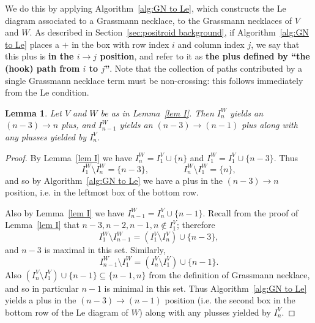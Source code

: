 \documentclass[11pt]{article}
\newtheorem{lem}[thm]{Lemma}
\theoremstyle{remark}
\theoremstyle{definition}
\begin{document}
We do this by applying Algorithm~\ref{alg:GN to Le}, which constructs the Le diagram associated to a Grassmann necklace, to the Grassmann necklaces of $V$ and $W$. As described in Section~\ref{sec:positroid background}, if Algorithm~\ref{alg:GN to Le} places a $+$ in the box with row index $i$ and column index $j$, we say that this plus is {\bf in the $i \rightarrow j$ position}, and refer to it as {\bf the plus defined by ``the (hook) path from $i$ to $j$''}. Note that the collection of paths contributed by a single Grassmann necklace term must be non-crossing: this follows immediately from the Le condition.






\begin{lem}\label{lem n and n-1}
Let $V$ and $W$ be as in Lemma~\ref{lem I}.
Then
%
  $I_n^W$ yields an $(n-3)\rightarrow n$ plus, and $I_{n-1}^W$ yields an $(n-3)\rightarrow (n-1)$ plus along with any plusses yielded by $I_n^V$.
\end{lem}

\begin{proof}
By Lemma~\ref{lem I} we have $I_n^{W}= I_1^{V} \cup \{n\}$ and $I_1^{W} = I_1^{V} \cup \{n-3\}$. Thus 
\[I_1^{W} \setminus I_n^{W} = \{n-3\}, \qquad \qquad I_n^{W} \setminus I_1^{W} = \{n\},\]
and so by Algorithm~\ref{alg:GN to Le} we have a plus in the $(n-3) \rightarrow n$ position, i.e. in the leftmost box of the bottom row. 

Also by Lemma~\ref{lem I} we have $I_{n-1}^{W} = I_n^{V} \cup \{n-1\}$. Recall from the proof of Lemma~\ref{lem I} that $n-3,n-2,n-1,n \not\in I_1^V$; therefore
\[
I_1^W\setminus I_{n-1}^W = (I_1^V \setminus I_n^V) \cup\{n-3\},
\]
and $n-3$ is maximal in this set. Similarly, 
\[I_{n-1}^W \setminus I_1^W = (I_n^V \setminus I_1^V) \cup \{n-1\}.
\]
Also $(I_n^V \setminus I_1^V) \cup \{n-1\}\subseteq \{n-1,n\}$ from the definition of Grassmann necklace, and so in particular $n-1$ is minimal in this set. Thus Algorithm~\ref{alg:GN to Le} yields a plus in the $(n-3) \rightarrow (n-1)$ position (i.e. the second box in the bottom row of the Le diagram of $W$) along with any plusses yielded by $I_n^V$.
\end{proof} 
\end{document}
